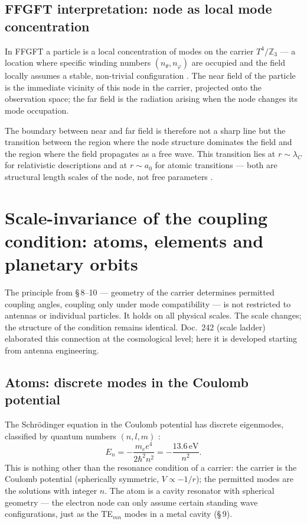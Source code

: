\subsection*{FFGFT interpretation: node as local mode concentration}

In FFGFT a particle is a local concentration of modes on the carrier
$T^4/\mathbb{Z}_3$ --- a location where specific winding numbers
$(n_\theta, n_\varphi)$ are occupied and the field locally assumes a
stable, non-trivial configuration \SetzM. The near field of the particle
is the immediate vicinity of this node in the carrier, projected onto the
observation space; the far field is the radiation arising when the node
changes its mode occupation.

The boundary between near and far field is therefore not a sharp line but
the transition between the region where the node structure dominates the
field and the region where the field propagates as a free wave. This
transition lies at $r\sim\lambda_C$ for relativistic descriptions and at
$r\sim a_0$ for atomic transitions --- both are structural length scales
of the node, not free parameters \SM.

\section{Scale-invariance of the coupling condition: atoms, elements and planetary orbits}

The principle from \S\,8--10 --- geometry of the carrier determines
permitted coupling angles, coupling only under mode compatibility --- is not
restricted to antennas or individual particles. It holds on all physical
scales. The scale changes; the structure of the condition remains identical.
Doc.~242 (scale ladder) elaborated this connection at the cosmological
level; here it is developed starting from antenna engineering.

\subsection*{Atoms: discrete modes in the Coulomb potential}

The Schr\"odinger equation in the Coulomb potential has discrete eigenmodes,
classified by quantum numbers $(n, l, m)$ \cite{Griffiths1995,CohenTannoudji1977}:
\[
  E_n = -\frac{m_e e^4}{2\hbar^2 n^2} = -\frac{13.6\,\mathrm{eV}}{n^2}.
\]
This is nothing other than the resonance condition of a carrier: the carrier
is the Coulomb potential (spherically symmetric, $V\propto -1/r$); the
permitted modes are the solutions with integer $n$. The atom is a cavity
resonator with spherical geometry --- the electron node can only assume
certain standing wave configurations, just as the TE$_{mn}$ modes in a
metal cavity (\S\,9).

